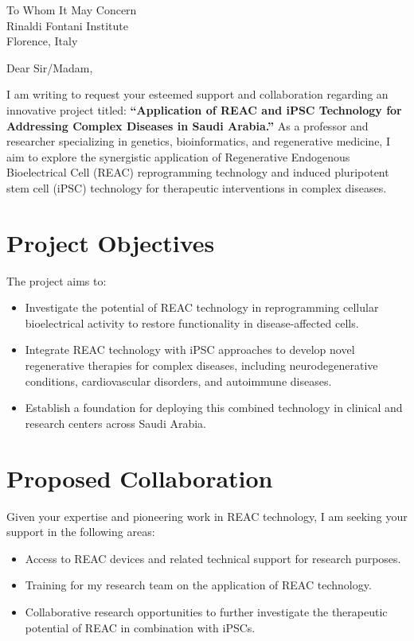 \documentclass[a4paper,12pt]{letter}
\date{\today}
\begin{document}
  

\begin{letter}{To Whom It May Concern \\ Rinaldi Fontani Institute \\ Florence, Italy}

\opening{Dear Sir/Madam,}

I am writing to request your esteemed support and collaboration regarding an innovative project titled: \textbf{“Application of REAC and iPSC Technology for Addressing Complex Diseases in Saudi Arabia.”} As a professor and researcher specializing in genetics, bioinformatics, and regenerative medicine, I aim to explore the synergistic application of Regenerative Endogenous Bioelectrical Cell (REAC) reprogramming technology and induced pluripotent stem cell (iPSC) technology for therapeutic interventions in complex diseases.

\section*{Project Objectives}
The project aims to:
\begin{itemize}
    \item Investigate the potential of REAC technology in reprogramming cellular bioelectrical activity to restore functionality in disease-affected cells.
    \item Integrate REAC technology with iPSC approaches to develop novel regenerative therapies for complex diseases, including neurodegenerative conditions, cardiovascular disorders, and autoimmune diseases.
    \item Establish a foundation for deploying this combined technology in clinical and research centers across Saudi Arabia.
\end{itemize}

\section*{Proposed Collaboration}
Given your expertise and pioneering work in REAC technology, I am seeking your support in the following areas:
\begin{itemize}
    \item Access to REAC devices and related technical support for research purposes.
    \item Training for my research team on the application of REAC technology.
    \item Collaborative research opportunities to further investigate the therapeutic potential of REAC in combination with iPSCs.
\end{itemize}


\end{letter}
\end{document}
